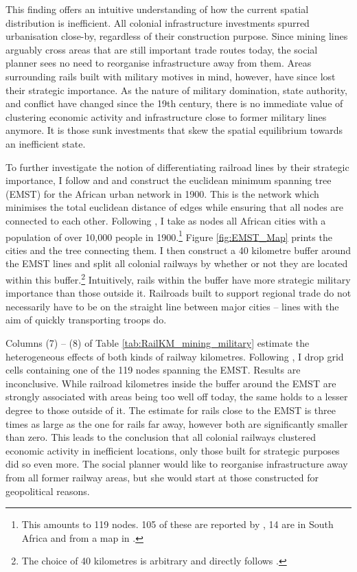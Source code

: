 \documentclass[11pt, oneside]{article}   	%
\begin{document}
This finding offers an intuitive understanding of how the current spatial distribution is inefficient. All colonial infrastructure investments spurred urbanisation close-by, regardless of their construction purpose. Since mining lines arguably cross areas that are still important trade routes today, the social planner sees no need to reorganise infrastructure away from them. Areas surrounding rails built with military motives in mind, however, have since lost their strategic importance. As the nature of military domination, state authority, and conflict have changed since the 19th century, there is no immediate value of clustering economic activity and infrastructure close to former military lines anymore. It is those sunk investments that skew the spatial equilibrium towards an inefficient state.

To further investigate the notion of differentiating railroad lines by their strategic importance, I follow \cite{jedwab_permanent_2016} and \cite{faber_trade_2014} and construct the euclidean minimum spanning tree (EMST) for the African urban network in 1900. This is the network which minimises the total euclidean distance of edges while ensuring that all nodes are connected to each other. Following \citeauthor{jedwab_permanent_2016}, I take as nodes all African cities with a population of over 10,000 people in 1900.\footnote{This amounts to 119 nodes. 105 of these are reported by \cite{jedwab_permanent_2016}, 14 are in South Africa and from a map in \cite{Herranz-Loncan_publicbenefitRailways_2017}.} Figure \eqref{fig:EMST_Map} prints the cities and the tree connecting them. I then construct a 40 kilometre buffer around the EMST lines and split all colonial railways by whether or not they are located within this buffer.\footnote{The choice of 40 kilometres is arbitrary and directly follows \cite{jedwab_permanent_2016}.} Intuitively, rails within the buffer have more strategic military importance than those outside it. Railroads built to support regional trade do not necessarily have to be on the straight line between major cities -- lines with the aim of quickly transporting troops do.

Columns (7) -- (8) of Table \eqref{tab:RailKM_mining_military} estimate the heterogeneous effects of both kinds of railway kilometres. Following \citeauthor{jedwab_permanent_2016}, I drop grid cells containing one of the 119 nodes spanning the EMST. Results are inconclusive. While railroad kilometres inside the buffer around the EMST are strongly associated with areas being too well off today, the same holds to a lesser degree to those outside of it. The estimate for rails close to the EMST is three times as large as the one for rails far away, however both are significantly smaller than zero. This leads to the conclusion that all colonial railways clustered economic activity in inefficient locations, only those built for strategic purposes did so even more. The social planner would like to reorganise infrastructure away from all former railway areas, but she would start at those constructed for geopolitical reasons.
\end{document}
